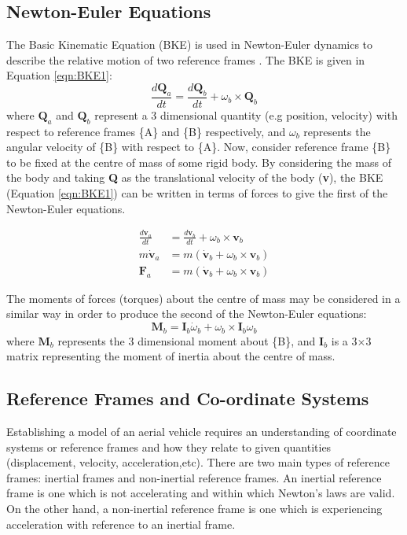 
\subsection{Newton-Euler Equations}
The Basic Kinematic Equation (BKE) is used in Newton-Euler dynamics to describe the relative motion of two reference frames \cite{Ardema2006}. The BKE is given in Equation \ref{eqn:BKE1}:
\begin{equation}\label{eqn:BKE1} 
\frac{d\textbf{Q}_{a}}{dt}=\frac{d\textbf{Q}_{b}}{dt}+\omega_{b} \times \textbf{Q}_{b}
\end{equation}
where $\textbf{Q}_{a}$ and $\textbf{Q}_{b}$ represent a 3 dimensional quantity (e.g position, velocity) with respect to reference frames \{A\} and \{B\} respectively, and $\omega_{b}$ represents the angular velocity of \{B\} with respect to \{A\}. Now, consider reference frame \{B\} to be fixed at the centre of mass of some rigid body. By considering the mass of the body and taking \textbf{Q} as the translational velocity of the body (\textbf{v}), the BKE (Equation \ref{eqn:BKE1}) can be written in terms of forces to give the first of the Newton-Euler equations.

\begin{equation}\label{eqn:BKE2}
\begin{split} 
\frac{d\textbf{v}_{a}}{dt}&=\frac{d\textbf{v}_{b}}{dt}+\omega_{b} \times \textbf{v}_{b}\\
m\dot{\textbf{v}}_{a}&=m(\dot{\textbf{v}}_{b}+\omega_{b} \times \textbf{v}_{b})\\
\textbf{F}_{a}&=m(\dot{\textbf{v}}_{b}+\omega_{b}\times\textbf{v}_{b})
\end{split}
\end{equation}

The moments of forces (torques) about the centre of mass may be considered in a similar way in order to produce the second of the Newton-Euler equations\cite{Ardema2006}:
\begin{equation}\label{eqn:Euler2}
\textbf{M}_{b}=\textbf{I}_{b}\dot{\omega}_{b}+\omega_{b}\times\textbf{I}_{b}\omega_{b}
\end{equation}
where $\textbf{M}_{b}$ represents the 3 dimensional moment about \{B\}, and $\textbf{I}_{b}$ is a 3$\times$3 matrix representing the moment of inertia about the centre of mass.

\subsection{Reference Frames and Co-ordinate Systems}\label{section:RefFrames}
Establishing a model of an aerial vehicle requires an understanding of coordinate systems or reference frames and how they relate to given quantities (displacement, velocity, acceleration,etc). There are two main types of reference frames: inertial frames and non-inertial reference frames. An inertial reference frame is one which is not accelerating and within which Newton's laws are valid\cite{Nebylov2016}. On the other hand, a non-inertial reference frame is one which is experiencing acceleration with reference to an inertial frame.

